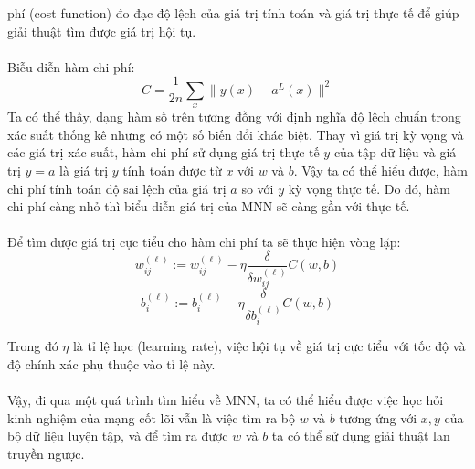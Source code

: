 phí (cost function) đo đạc độ lệch của giá trị tính toán và giá trị thực tế 
để giúp giải thuật tìm được giá trị hội tụ.\\\\
Biễu diễn hàm chi phí:\\
\[
  C=\frac{1}{2n}\sum_x\|y(x)-a^L(x)\|^2
\]
Ta có thể thấy, dạng hàm số trên tương đồng với định nghĩa độ lệch chuẩn trong 
xác suất thống kê nhưng có một số biến đổi khác biệt. Thay vì giá trị kỳ vọng 
và các giá trị xác suất, hàm chi phí sử dụng giá trị thực tế $y$ của tập dữ 
liệu và giá trị $y=a$ là giá trị $y$ tính toán được từ $x$ với $w$ và $b$. Vậy 
ta có thể hiểu được, hàm chi phí tính toán độ sai lệch của giá trị $a$ so với 
$y$ kỳ vọng thực tế. Do đó, hàm chi phí càng nhỏ thì biểu diễn giá trị của 
MNN sẽ càng gần với thực tế.\\\\
Để tìm được giá trị cực tiểu cho hàm chi phí ta sẽ thực hiện vòng lặp:\\
\[
  w_{ij}^{(\ell)}:=w_{ij}^{(\ell)}-\eta\frac{\delta}{\delta w_{ij}^{(\ell)}}C(w,b)
\]
\[
  b_i^{(\ell)}:=b_i^{(\ell)}-\eta\frac{\delta}{\delta b_i^{(\ell)}}C(w,b)
\]

Trong đó $\eta$ là tỉ lệ học (learning rate), việc hội tụ về giá trị cực tiểu 
với tốc độ và độ chính xác phụ thuộc vào tỉ lệ này.\\\\
Vậy, đi qua một quá trình tìm hiểu về MNN, ta có thể hiểu được việc học hỏi 
kinh nghiệm của mạng cốt lõi vẫn là việc tìm ra bộ $w$ và $b$ tương ứng với 
${x, y}$ của bộ dữ liệu luyện tập, và để tìm ra được $w$ và $b$ ta có thể sử 
dụng giải thuật lan truyền ngược.